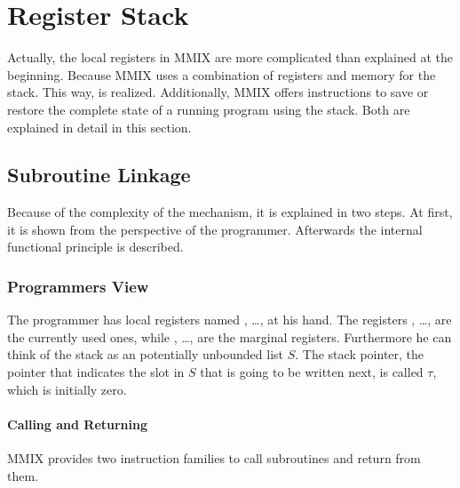 \section{Register Stack}

Actually, the local registers in MMIX are more complicated than explained at the beginning. Because MMIX uses a combination of registers and memory for the stack. This way,  is realized. Additionally, MMIX offers instructions to save or restore the complete state of a running program using the stack. Both are explained in detail in this section.

\subsection{Subroutine Linkage}

Because of the complexity of the  mechanism, it is explained in two steps. At first, it is shown from the perspective of the programmer. Afterwards the internal functional principle is described.

\subsubsection{Programmers View}

The programmer has  local registers named , \dots,  at his hand. The registers , \dots,  are the currently used ones, while , \dots,  are the marginal registers. Furthermore he can think of the stack as an potentially unbounded list $S$. The stack pointer, \ie the pointer that indicates the slot in $S$ that is going to be written next, is called $\tau$, which is initially zero. \citep[pg. 22]{mmix-doc}

\paragraph{Calling and Returning}

MMIX provides two instruction families to call subroutines and return from them.

